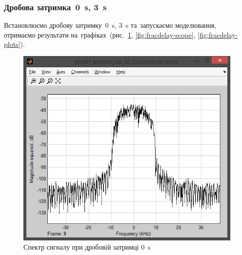 \documentclass[
	a4paper,
	oneside,
	BCOR = 10mm,
	DIV = 12,
	12pt,
	headings = normal,
]{scrartcl}
\begin{document}
			\subsubsection{Дробова затримка~\SI{0}{\second}, \SI{3}{\second}}
				Встановлюємо дробову затримку~\SI{0}{\second}, \SI{3}{\second} та~запускаємо моделювання, отримаємо результати на~графіках~(рис.~\ref{fig:fracdelay-spectrum-scope}, \ref{fig:fracdelay-scope}, \ref{fig:fracdelay-plots}).

				\begin{figure}[!htbp]
					\begin{minipage}[t]{0.5\textwidth - 0.5em}
						\centering
						\includegraphics[height = 8\baselineskip]{../01-solution/00-SNR-100db-noshift-modulator-spectrum.png}
						\caption{Спектр сигналу при дробовій затримці \SI{0}{\second}}
						\label{fig:fracdelay-spectrum-scope}
					\end{minipage}\hspace{1em}%
					\begin{minipage}[t]{0.5\textwidth - 0.5em}
						\centering

\end{minipage}
\end{figure}
\end{document}
